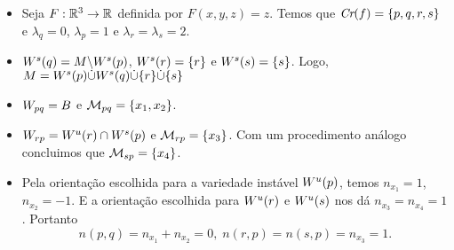 \documentclass{beamer}
\begin{document}
	\begin{frame}
		\begin{itemize}
				\item Seja $F:\mathbb{R}^{3} \to \mathbb{R}^{}$ definida por $F(x, y, z) = z$. Temos que $\textit{Cr}(f) = \{p,q,r,s\}$ e $\lambda_{q} = 0$, $\lambda_{p} = 1$ e $\lambda_{r}=\lambda_{s} = 2$. 
				
				\item $W^{s}(q) = M \backslash W^{s}(p)$, $W^{s}(r) =\{r\}$ e $ W^{s}(s) = \{s\}$. Logo, $M = W^{s}(p)\dot{\cup} W^{s}(q)\dot{\cup}\{r\}\dot{\cup}\{s\}$
				
				\item $W_{pq} = B$ e $\mathcal{M}_{pq}=\{x_{1}, x_{2}\}$. 
				
				\item $W_{rp} = W^{u}(r) \cap W^{s}(p)$ e $\mathcal{M}_{rp} = \{ x_{3}\}$. Com um procedimento análogo concluimos que $\mathcal{M}_{sp} = \{x_{4} \}$.
				
				\item Pela orientação escolhida para a variedade instável $W^{u}(p)$, temos $n_{x_{1}}=1$, $n_{x_{2}} = -1$. E a orientação escolhida para $W^{u}(r)$ e $W^{u}(s)$ nos dá $n_{x_{3}} =n_{x_{4}}= 1$. Portanto 
				$$
				n(p,q) = n_{x_{1}}+n_{x_{2}} = 0,\; n(r,p) = n(s,p)=n_{x_{3}}= 1. 
				$$			
		\end{itemize}
	\end{frame}
	
\end{document}

